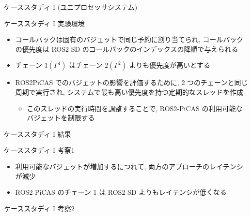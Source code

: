 \begin{frame}{ケーススタディ I (ユニプロセッサシステム)}
\end{frame}

\begin{frame}{ケーススタディ I 実験環境}
    \begin{itemize}
        \item コールバックは固有のバジェットで同じ予約に割り当てられ, コールバックの優先度は ROS2-SD のコールバックのインデックスの降順で与えられる
        \item チェーン $1\left(\Gamma^{1}\right)$ はチェーン $2\left(\Gamma^{2}\right)$ よりも優先度が高いとする
        \item ROS2PiCAS でのバジェットの影響を評価するために, 2 つのチェーンと同じ周期で実行され, システムで最も高い優先度を持つ定期的なスレッドを作成
              \begin{itemize}
                  \item このスレッドの実行時間を調整することで, ROS2-PiCAS の利用可能なバジェットを制限する
              \end{itemize}
    \end{itemize}
\end{frame}

\begin{frame}{ケーススタディ I 結果}
\end{frame}

\begin{frame}{ケーススタディ I 考察1}
    \begin{itemize}
        \item 利用可能なバジェットが増加するにつれて, 両方のアプローチのレイテンシが減少
        \item ROS2-PiCAS のチェーン 1 は ROS2-SD よりもレイテンシが低くなる
    \end{itemize}
\end{frame}

\begin{frame}{ケーススタディ I 考察2}
\end{frame}

